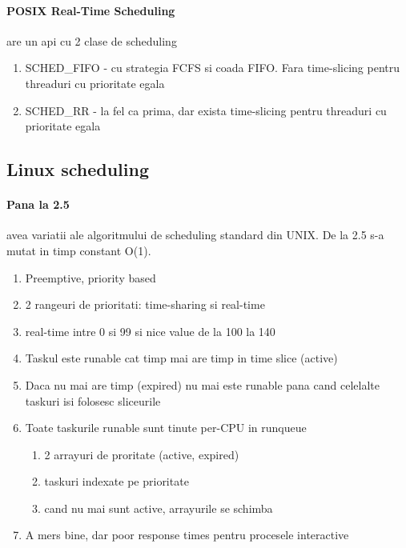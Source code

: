 \documentclass{article}
\begin{document}
\paragraph*{POSIX Real-Time Scheduling} are un api cu 2 clase de scheduling
\begin{enumerate}
    \item SCHED\_FIFO - cu strategia FCFS si coada FIFO. Fara time-slicing pentru threaduri cu prioritate egala
    \item SCHED\_RR - la fel ca prima, dar exista time-slicing pentru threaduri cu prioritate egala
\end{enumerate}


\subsection*{Linux scheduling}
\paragraph*{Pana la 2.5} avea variatii ale algoritmului de scheduling standard din UNIX. De la 2.5 s-a mutat in timp constant O(1).
\begin{enumerate}
    \item Preemptive, priority based
    \item 2 rangeuri de prioritati: time-sharing si real-time
    \item real-time intre 0 si 99 si nice value de la 100 la 140
    \item Taskul este runable cat timp mai are timp in time slice (active)
    \item Daca nu mai are timp (expired) nu mai este runable pana cand celelalte taskuri isi folosesc sliceurile
    \item Toate taskurile runable sunt tinute per-CPU in runqueue
    \begin{enumerate}
        \item 2 arrayuri de proritate (active, expired)
        \item taskuri indexate pe prioritate
        \item cand nu mai sunt active, arrayurile se schimba
    \end{enumerate}
    \item A mers bine, dar poor response times pentru procesele interactive
\end{enumerate}
\end{document}
